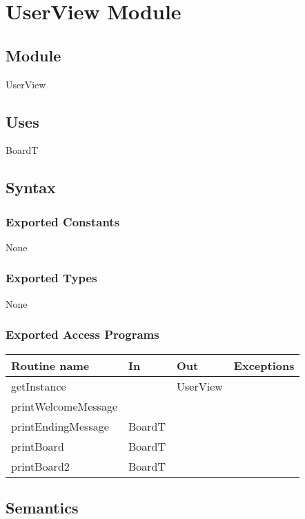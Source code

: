 \documentclass[12pt]{article}
\begin{document}
\newpage
\section* {UserView Module}

\subsection*{Module}

UserView


\subsection* {Uses}

BoardT

\subsection* {Syntax}

\subsubsection* {Exported Constants}

None

\subsubsection* {Exported Types}

None

\subsubsection* {Exported Access Programs}

\begin{tabular}{| l | l | l | p{5cm} |}
\hline
\textbf{Routine name} & \textbf{In} & \textbf{Out} & \textbf{Exceptions}\\
\hline
getInstance & ~ & UserView & \\
\hline
printWelcomeMessage & &  & ~\\
\hline
printEndingMessage & BoardT &  & ~\\
\hline
printBoard & BoardT &  & ~\\
\hline
printBoard2 & BoardT &  & ~\\
\hline

\end{tabular}

\subsection* {Semantics}
\end{document}
